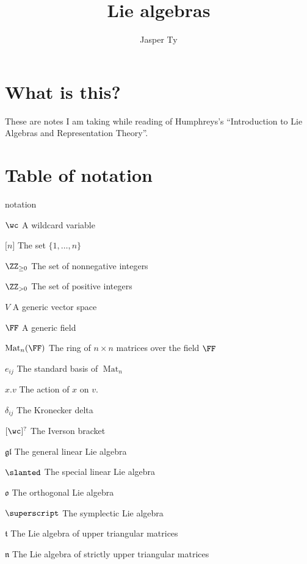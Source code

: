 \documentclass{article}
\title{Lie algebras}
\author{Jasper Ty}
\date{}
\DeclareMathOperator{\Mat}{Mat}
\newcommand*\gl{\ensuremath{\mathfrak{gl}}}
\let\sl\slanted
\newcommand*\sl{\ensuremath{\mathfrak{sl}}}
\let\sp\superscript
\newcommand*\sp{\ensuremath{\mathfrak{sp}}}
\newcommand*\talg{\ensuremath{\mathfrak{t}}}
\newcommand*\nalg{\ensuremath{\mathfrak{n}}}
\newcommand*\oalg{\ensuremath{\mathfrak{o}}}
\newcommand*\acts{.}
\begin{document}
\maketitle

\section*{What is this?}

These are notes I am taking while reading of Humphreys's ``Introduction to Lie Algebras and Representation Theory''.

\tableofcontents

\newpage

\section*{Table of notation}

\begin{labeling}{notation}
    \item [$\wc$]
        A wildcard variable
    \item [$\lbrack n \rbrack$]
        The set $\{1, \ldots, n\}$
    \item [$\ZZ_{\geq 0}$]
        The set of nonnegative integers
    \item [$\ZZ_{>0}$]
        The set of positive integers
    \item [$V$]
        A generic vector space
    \item [$\FF$]
        A generic field
    \item [$\Mat_n(\FF)$]
        The ring of $n \times n$ matrices over the field $\FF$
    \item [$e_{ij}$]
        The standard basis of $\Mat_n$
    \item [$x \acts v$]
        The action of $x$ on $v$.
    \item [$\delta_{ij}$]
        The Kronecker delta
    \item [$\lbrack \wc \rbrack^?$]
        The Iverson bracket
    \item [$\gl$]
        The general linear Lie algebra
    \item [$\sl$]
        The special linear Lie algebra
    \item [$\oalg$]
        The orthogonal Lie algebra
    \item [$\sp$]
        The symplectic Lie algebra
    \item [$\talg$]
        The Lie algebra of upper triangular matrices
    \item [$\nalg$]
        The Lie algebra of strictly upper triangular matrices
\end{labeling}
\end{document}
